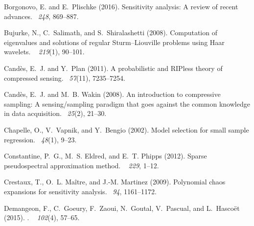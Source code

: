 \documentclass[a4paper,11pt]{article}
\theoremstyle{definition}
\theoremstyle{remark}
\theoremstyle{theorem}
\begin{document}
\begin{thebibliography}{}
	Borgonovo, E. and E.~Plischke (2016).
	\newblock Sensitivity analysis: {A} review of recent advances.
	~{\em 248}, 869--887.
	
	Bujurke, N., C.~Salimath, and S.~Shiralashetti (2008).
	\newblock Computation of eigenvalues and solutions of regular
	{S}turm--{L}iouville problems using {H}aar wavelets.
	~{\em
		219\/}(1), 90--101.
	
	Cand\`es, E.~J. and Y.~Plan (2011).
	\newblock A probabilistic and {RIP}less theory of compressed sensing.
	~{\em 57\/}(11),
	7235--7254.
	
	Cand{\`e}s, E.~J. and M.~B. Wakin (2008).
	\newblock An introduction to compressive sampling: {A} sensing/sampling
	paradigm that goes against the common knowledge in data acquisition.
	~{\em 25\/}(2), 21--30.
	
	Chapelle, O., V.~Vapnik, and Y.~Bengio (2002).
	\newblock Model selection for small sample regression.
	~{\em 48\/}(1), 9--23.
	
	Constantine, P.~G., M.~S. Eldred, and E.~T. Phipps (2012).
	\newblock Sparse pseudospectral approximation method.
	~{\em
		229}, 1--12.
	
	Crestaux, T., O.~L. Ma\^itre, and J.-M. Martinez (2009).
	\newblock Polynomial chaos expansions for sensitivity analysis.
	~{\em 94},
	1161--1172.
	
	Demangeon, F., C.~Goeury, F.~Zaoui, N.~Goutal, V.~Pascual, and L.~Hasco{\"e}t
	(2015).
	.
	~{\em
		102\/}(4), 57--65.
	

\end{thebibliography}
\end{document}
